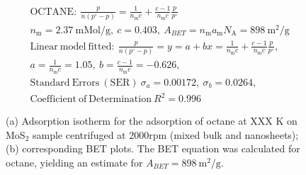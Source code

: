 

\begin{align*}
&\mathrm{OCTANE:}\ \frac{p}{n(p^\circ-p)}=\frac{1}{n_\mathrm{m}c}+\frac{c-1}{n_\mathrm{m}c}\frac{p}{p^\circ}\\
&{n_\mathrm{m}}=2.37\ \mathrm{mMol/g},\ c=0.403,\ A_{BET}={n_\mathrm{m}}{a_\mathrm{m}}{N_\mathrm{A}}=898\ \mathrm{m}^2\mathrm{/g}\\
&\mathrm{Linear\ model\ fitted:}\ \frac{p}{n(p^\circ-p)}=y=a+bx=\frac{1}{n_\mathrm{m}c}+\frac{c-1}{n_\mathrm{m}c}\frac{p}{p^\circ},\\
&a=\frac{1}{n_\mathrm{m}c}=1.05,\ b=\frac{c-1}{n_\mathrm{m}c}=-0.626,\\
&\mathrm{Standard\ Errors\ (SER)}\ \sigma_a=0.00172,\ \sigma_b=0.0264,\\
&\mathrm{Coefficient\ of\ Determination}\ R^2 = 0.996
\end{align*}


\begin{figure}[htb]
\hfill
{}
\caption{(a) Adsorption isotherm for the adsorption of octane at XXX K on MoS$_2$ 
sample centrifuged at 2000rpm (mixed bulk and nanosheets);
(b) corresponding BET plots. The BET equation was calculated for octane, yielding an estimate for $A_{BET}=898\ \mathrm{m}^2\mathrm{/g}$.}

\label{fig:sa-Nanosheets-Prep-II-4000rpm-3mg-01-3mm-50C-S1-SE-10ml}
\end{figure}


